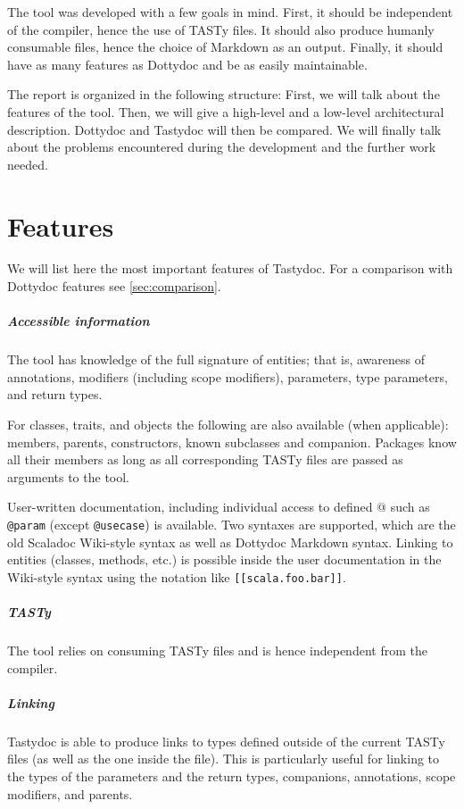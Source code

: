 \documentclass{report}
\begin{document}
The tool was developed with a few goals in mind. First, it should be independent of the compiler, hence the use of TASTy files. It should also produce humanly consumable files, hence the choice of Markdown as an output. Finally, it should have as many features as Dottydoc and be as easily maintainable.

The report is organized in the following structure: First, we will talk about the features of the tool. Then, we will give a high-level and a low-level architectural description. Dottydoc and Tastydoc will then be compared. We will finally talk about the problems encountered during the development and the further work needed.

\chapter{Features}
We will list here the most important features of Tastydoc. For a comparison with Dottydoc features see \autoref{sec:comparison}.

\paragraph{Accessible information}
The tool has knowledge of the full signature of entities; that is, awareness of annotations, modifiers (including scope modifiers), parameters, type parameters, and return types.

For classes, traits, and objects the following are also available (when applicable): members, parents, constructors, known subclasses and companion.
Packages know all their members as long as all corresponding TASTy files are passed as arguments to the tool.

User-written documentation, including individual access to defined @ such as \texttt{@param} (except \texttt{@usecase}) is available. Two syntaxes are supported, which are the old Scaladoc Wiki-style syntax as well as Dottydoc Markdown syntax. Linking to entities (classes, methods, etc.) is possible inside the user documentation in the Wiki-style syntax using the notation like \texttt{[[scala.foo.bar]]}.

\paragraph{TASTy}
The tool relies on consuming TASTy files and is hence independent from the compiler.

\paragraph{Linking}
Tastydoc is able to produce links to types defined outside of the current TASTy files (as well as the one inside the file). This is particularly useful for linking to the types of the parameters and the return types, companions, annotations, scope modifiers, and parents.
\end{document}
